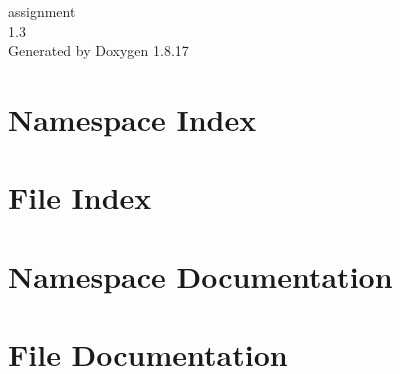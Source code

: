 \let\mypdfximage\pdfximage\def\pdfximage{\immediate\mypdfximage}\documentclass[twoside]{book}
\newcommand{\+}{\discretionary{\mbox{\scriptsize$\hookleftarrow$}}{}{}}
\newcommand{\clearemptydoublepage}{%
  \newpage{\pagestyle{empty}\cleardoublepage}%
}
\begin{document}
\hypersetup{pageanchor=false,
             bookmarksnumbered=true,
             pdfencoding=unicode
            }
\begin{titlepage}
\vspace*{7cm}
\begin{center}%
{\Large assignment \\[1ex]\large 1.\+3 }\\
\vspace*{1cm}
{\large Generated by Doxygen 1.8.17}\\
\end{center}
\end{titlepage}
\clearemptydoublepage
{}
\tableofcontents
\clearemptydoublepage
{}
\hypersetup{pageanchor=true}

\chapter{Namespace Index}

\chapter{File Index}

\chapter{Namespace Documentation}





\chapter{File Documentation}







\backmatter
\newpage
{}
\clearemptydoublepage
{}
\printindex
\end{document}
